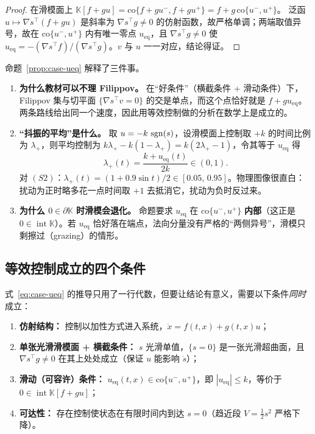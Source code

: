 \begin{proof}
  在滑模面上 $\mathbb{K}[f+gu]=\mathrm{co}\{f+gu^-,f+gu^+\}=f+g\,\mathrm{co}\{u^-,u^+\}$。
  泛函 $u\mapsto\nabla s^\top(f+gu)$ 是斜率为 $\nabla s^\top g\neq0$ 的仿射函数，故严格单调；两端取值异号，故在 $\mathrm{co}\{u^-,u^+\}$ 内有唯一零点 $u_\mathrm{eq}$，且 $\nabla s^\top g\neq0$ 使 $u_\mathrm{eq}=-(\nabla s^\top f)/(\nabla s^\top g)$。$v$ 与 $u$ 一一对应，结论得证。
\end{proof}

命题~\ref{prop:case-ueq} 解释了三件事。

\begin{enumerate}
  \item \textbf{为什么教材可以不理 Filippov。} 在“好条件”（横截条件 + 滑动条件）下，Filippov 集与切平面 $\{\nabla s^\top v=0\}$ 的交是单点，而这个点恰好就是 $f+gu_\mathrm{eq}$。两条路线给出同一个速度，因此用等效控制做的分析在数学上是成立的。
  \item \textbf{“抖振的平均”是什么。} 取 $u=-k\,\operatorname{sgn}(s)$，设滑模面上控制取 $+k$ 的时间比例为 $\lambda_+$，则平均控制为 $k\lambda_+-k(1-\lambda_+)=k(2\lambda_+-1)$，令其等于 $u_\mathrm{eq}$ 得
  \[
  \lambda_+(t)=\frac{k+u_\mathrm{eq}(t)}{2k}\in(0,1).
  \]
  对 $(S2)$：$\lambda_+(t)=(1+0.9\sin t)/2\in[0.05,\,0.95]$。物理图像很直白：扰动为正时略多花一点时间取 $+1$ 去抵消它，扰动为负时反过来。
  \item \textbf{为什么 $0\in\partial\mathbb{K}$ 时滑模会退化。} 命题要求 $u_\mathrm{eq}$ 在 $\mathrm{co}\{u^-,u^+\}$ \textbf{内部}（这正是 $0\in\operatorname{int}\mathbb{K}$）。若 $u_\mathrm{eq}$ 恰好落在端点，法向分量没有严格的“两侧异号”，滑模只剩擦过（grazing）的情形。
\end{enumerate}

\subsection{等效控制成立的四个条件}\label{sec:case-ec-conditions}

式~\eqref{eq:case-ueq} 的推导只用了一行代数，但要让结论有意义，需要以下条件\emph{同时}成立：

\begin{enumerate}
  \item \textbf{仿射结构：} 控制以加性方式进入系统，$\dot x=f(t,x)+g(t,x)u$；
  \item \textbf{单张光滑滑模面 + 横截条件：} $s$ 光滑单值，$\{s=0\}$ 是一张光滑超曲面，且 $\nabla s^\top g\neq0$ 在其上处处成立（保证 $u$ 能影响 $\dot s$）；
  \item \textbf{滑动（可容许）条件：} $u_\mathrm{eq}(t,x)\in\mathrm{co}\{u^-,u^+\}$，即 $|u_\mathrm{eq}|\le k$，等价于 $0\in\operatorname{int}\mathbb{K}[f+gu]$；
  \item \textbf{可达性：} 存在控制使状态在有限时间内到达 $s=0$（趋近段 $V=\tfrac12s^2$ 严格下降）。
\end{enumerate}

